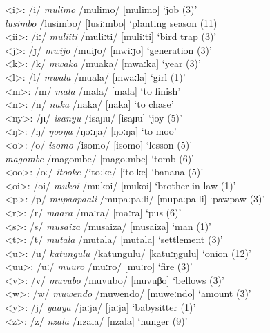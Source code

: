 \begin{tabbing}
<i>:  \>  /i/ \>   \textit{mulimo} /mulimo/ [mulimo] ‘job (3)’\\
  	\>		  \>	 \textit{lusimbo} /lusimbo/ [lusiːmbo] `planting season (11)\\
<ii>:  \>  /iː/  \>   \textit{muliiti} /muliːti/ [muliːti] ‘bird trap (3)’\\
<j>:  \>  /ɟ/  \>   \textit{mwijo} /muiɟo/ [mwiːɟo]  ‘generation (3)’\\
<k>:  \>  /k/  \>   \textit{mwaka} /muaka/ [mwaːka] ‘year (3)’\\
<l>:  \>  /l/  \>   \textit{mwala} /muala/ [mwaːla] ‘girl (1)'\\
<m>:  \>  /m/  \>   \textit{mala} /mala/  [mala] ‘to finish’\\
<n>:  \>  /n/  \>   \textit{naka} /naka/ [naka] ‘to chase’\\
<ny>:  \>  /ɲ/  \>   \textit{isanyu} /isaɲu/ [isaɲu] ‘joy (5)’\\
<ŋ>:  \>  /ŋ/  \>   \textit{ŋooŋa} /ŋoːŋa/ [ŋoːŋa] ‘to moo’\\
<o>:  \>  /o/  \>   \textit{isomo} /isomo/ [isomo] ‘lesson (5)’ \\
	\> 	\>  \textit{magombe} /magombe/ [magoːmbe] `tomb (6)'\\
<oo>:  \>  /oː/  \>   \textit{itooke} /itoːke/ [itoːke] ‘banana (5)’\\
<oi>:  \>  /oi/  \>   \textit{mukoi} /mukoi/ [mukoi] ‘brother-in-law (1)’\\
<p>:  \>  /p/  \>   \textit{mupaapaali} /mupaːpaːli/ [mupaːpaːli] ‘pawpaw (3)’\\
<r>:  \>  /r/  \>   \textit{maara} /maːra/ [maːra] ‘pus (6)’\\
<s>:  \>  /s/  \>   \textit{musaiza} /musaiza/ [musaiza] ‘man (1)’\\
<t>:  \>  /t/  \>   \textit{mutala} /mutala/ [mutala] ‘settlement (3)’\\
<u>:  \>  /u/  \>   \textit{katungulu} /katungulu/ [katuːŋgulu] ‘onion (12)’\\
<uu>:  \>  /uː/  \>   \textit{muuro} /muːro/ [muːro] ‘fire (3)’\\
<v>:  \>  /v/  \>   \textit{muvubo} /muvubo/ [muvuβo]  ‘bellows (3)’\\
<w>:  \>  /w/  \>   \textit{muwendo} /muwendo/ [muweːndo] ‘amount (3)’\\
<y>:  \>  /j/  \>   \textit{yaaya} /jaːja/ [jaːja] ‘babysitter (1)’\\
<z>:  \>  /z/  \>   \textit{nzala} /nzala/ [nzala] ‘hunger (9)’
 \end{tabbing}
\z

